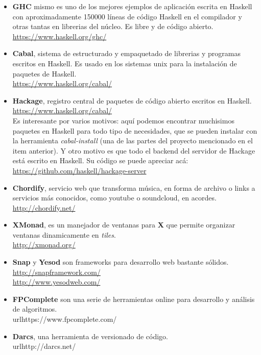 \begin{itemize}
  \item \textbf{GHC} mismo es uno de los mejores ejemplos de aplicación escrita en Haskell con aproximadamente 150000 líneas de código Haskell en el compilador y otras tantas en librerias del núcleo. Es libre y de código abierto.
  \\ \url{https://www.haskell.org/ghc/}

  \item \textbf{Cabal}, sistema de estructurado y empaquetado de librerias y programas escritos en Haskell. Es usado en los sistemas unix para la instalación de paquetes de Haskell.\\
  \url{https://www.haskell.org/cabal/}

  \item \textbf{Hackage}, registro central de paquetes de código abierto escritos en Haskell. \\
  \url{https://www.haskell.org/cabal/} \\
  Es interesante por varios motivos: aquí podemos encontrar muchisimos paquetes en Haskell para todo tipo de necesidades, que se pueden instalar con la herramienta \textit{cabal-install} (una de las partes del proyecto mencionado en el item anterior). Y otro motivo es que todo el backend del servidor de Hackage está escrito en Haskell. Su código se puede apreciar acá: \\ \url{https://github.com/haskell/hackage-server}

  \item \textbf{Chordify}, servicio web que transforma música, en forma de archivo o links a servicios más conocidos, como youtube o soundcloud, en acordes. \\ \url{http://chordify.net/}

  \item \textbf{XMonad}, es un manejador de ventanas para \textbf{X} que permite organizar ventanas dinamicamente en \textit{tiles}. \\ \url{http://xmonad.org/}

  \item \textbf{Snap} y \textbf{Yesod} son frameworks para desarrollo web bastante sólidos.
  \\ \url{http://snapframework.com/}
  \\ \url{http://www.yesodweb.com/}

  \item \textbf{FPComplete} son una serie de herramientas online para desarrollo y análisis de algoritmos. \\ url{https://www.fpcomplete.com/}

  \item \textbf{Darcs}, una herramienta de versionado de código. \\ url{http://darcs.net/}

  \end{itemize}



